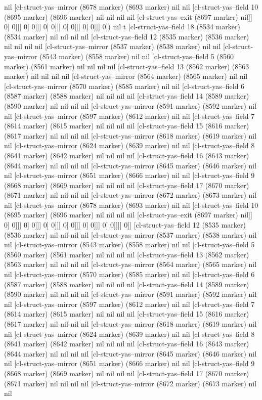 {{nil [cl-struct-yas--mirror (8678 marker) (8693 marker) nil nil [cl-struct-yas--field 10 (8695 marker) (8696 marker) nil nil nil nil [cl-struct-yas--exit (8697 marker) nil]] 0] 0]]] 0] 0]]] 0] 0]]] 0] 0]]] 0] 0]]] 0]) nil t [cl-struct-yas--field 18 (8534 marker) (8534 marker) nil nil nil nil [cl-struct-yas--field 12 (8535 marker) (8536 marker) nil nil nil nil [cl-struct-yas--mirror (8537 marker) (8538 marker) nil nil [cl-struct-yas--mirror (8543 marker) (8558 marker) nil nil [cl-struct-yas--field 5 (8560 marker) (8561 marker) nil nil nil nil [cl-struct-yas--field 13 (8562 marker) (8563 marker) nil nil nil nil [cl-struct-yas--mirror (8564 marker) (8565 marker) nil nil [cl-struct-yas--mirror (8570 marker) (8585 marker) nil nil [cl-struct-yas--field 6 (8587 marker) (8588 marker) nil nil nil nil [cl-struct-yas--field 14 (8589 marker) (8590 marker) nil nil nil nil [cl-struct-yas--mirror (8591 marker) (8592 marker) nil nil [cl-struct-yas--mirror (8597 marker) (8612 marker) nil nil [cl-struct-yas--field 7 (8614 marker) (8615 marker) nil nil nil nil [cl-struct-yas--field 15 (8616 marker) (8617 marker) nil nil nil nil [cl-struct-yas--mirror (8618 marker) (8619 marker) nil nil [cl-struct-yas--mirror (8624 marker) (8639 marker) nil nil [cl-struct-yas--field 8 (8641 marker) (8642 marker) nil nil nil nil [cl-struct-yas--field 16 (8643 marker) (8644 marker) nil nil nil nil [cl-struct-yas--mirror (8645 marker) (8646 marker) nil nil [cl-struct-yas--mirror (8651 marker) (8666 marker) nil nil [cl-struct-yas--field 9 (8668 marker) (8669 marker) nil nil nil nil [cl-struct-yas--field 17 (8670 marker) (8671 marker) nil nil nil nil [cl-struct-yas--mirror (8672 marker) (8673 marker) nil nil [cl-struct-yas--mirror (8678 marker) (8693 marker) nil nil [cl-struct-yas--field 10 (8695 marker) (8696 marker) nil nil nil nil [cl-struct-yas--exit (8697 marker) nil]] 0] 0]]] 0] 0]]] 0] 0]]] 0] 0]]] 0] 0]]] 0] 0]]]] 0]] [cl-struct-yas--field 12 (8535 marker) (8536 marker) nil nil nil nil [cl-struct-yas--mirror (8537 marker) (8538 marker) nil nil [cl-struct-yas--mirror (8543 marker) (8558 marker) nil nil [cl-struct-yas--field 5 (8560 marker) (8561 marker) nil nil nil nil [cl-struct-yas--field 13 (8562 marker) (8563 marker) nil nil nil nil [cl-struct-yas--mirror (8564 marker) (8565 marker) nil nil [cl-struct-yas--mirror (8570 marker) (8585 marker) nil nil [cl-struct-yas--field 6 (8587 marker) (8588 marker) nil nil nil nil [cl-struct-yas--field 14 (8589 marker) (8590 marker) nil nil nil nil [cl-struct-yas--mirror (8591 marker) (8592 marker) nil nil [cl-struct-yas--mirror (8597 marker) (8612 marker) nil nil [cl-struct-yas--field 7 (8614 marker) (8615 marker) nil nil nil nil [cl-struct-yas--field 15 (8616 marker) (8617 marker) nil nil nil nil [cl-struct-yas--mirror (8618 marker) (8619 marker) nil nil [cl-struct-yas--mirror (8624 marker) (8639 marker) nil nil [cl-struct-yas--field 8 (8641 marker) (8642 marker) nil nil nil nil [cl-struct-yas--field 16 (8643 marker) (8644 marker) nil nil nil nil [cl-struct-yas--mirror (8645 marker) (8646 marker) nil nil [cl-struct-yas--mirror (8651 marker) (8666 marker) nil nil [cl-struct-yas--field 9 (8668 marker) (8669 marker) nil nil nil nil [cl-struct-yas--field 17 (8670 marker) (8671 marker) nil nil nil nil [cl-struct-yas--mirror (8672 marker) (8673 marker) nil nil }}
